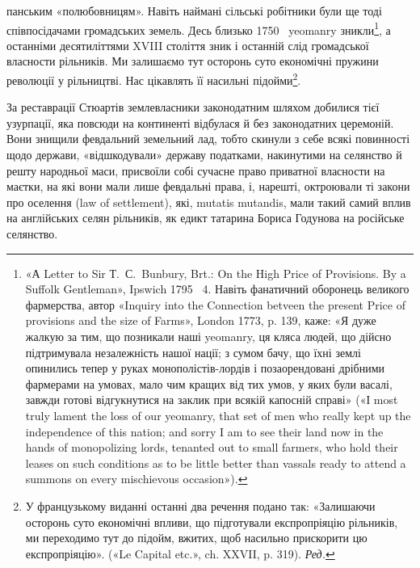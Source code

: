 \parcont{}  %
панським «полюбовницям». Навіть наймані сільські робітники
були ще тоді співпосідачами громадських земель. Десь близько
1750~ yeomanry зникли\footnote{
«А Letter to Sir Т.~С.~Bunbury, Brt.: On the High Price of Provisions.
By a Suffolk Gentleman», Ipswich 1795~ 4. Навіть фанатичний
оборонець великого фармерства, автор «Inquiry into the Connection
betveen the present Price of provisions and the size of Farms», London
1773, p. 139, каже: «Я дуже жалкую за тим, що позникали наші yeomanry,
ця кляса людей, що дійсно підтримувала незалежність нашої нації;
з сумом бачу, що їхні землі опинились тепер у руках монополістів-лордів
і позаорендовані дрібними фармерами на умовах, мало чим кращих від
тих умов, у яких були васалі, завжди готові відгукнутися на заклик при
всякій капосній справі» («І most truly lament the loss of our yeomanry, that
set of men who really kept up the independence of this nation; and sorry I am
to see their land now in the hands of monopolizing lords, tenanted out to
small farmers, who hold their leases on such conditions as to be little better
than vassals ready to attend a summons on every mischievous occasion»).
}, а останніми десятиліттями XVIII
століття зник і останній слід громадської власности рільників.
Ми залишаємо тут осторонь суто економічні пружини революції
у рільництві. Нас цікавлять її насильні підойми\footnote*{
У французькому виданні останні два речення подано так:
«Залишаючи осторонь суто економічні впливи, що підготували експропріяцію
рільників, ми переходимо тут до підойм, вжитих, щоб насильно
прискорити цю експропріяцію». («Le Capital etc.», ch. XXVII,
p. 319). \emph{Ред.}
}.

За реставрації Стюартів землевласники законодатним шляхом
добилися тієї узурпації, яка повсюди на континенті відбулася й
без законодатних церемоній. Вони знищили февдальний земельний
лад, тобто скинули з себе всякі повинності щодо держави,
«відшкодували» державу податками, накинутими на селянство
й решту народньої маси, присвоїли собі сучасне право приватної
власности на маєтки, на які вони мали лише февдальні права,
і, нарешті, октроювали ті закони про оселення (law of settlement),
які, mutatis mutandis, мали такий самий вплив на англійських
селян рільників, як едикт татарина Бориса Годунова на російське
селянство.

